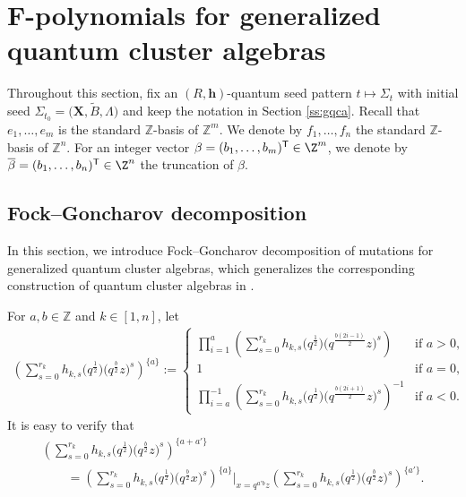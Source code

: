 \section[F-polynomials for generalized quantum cluster algebras]{$\boldsymbol{F}$-polynomials for generalized quantum cluster algebras}

Throughout this section, fix an $(R,\mathbf{h})$-quantum seed pattern $t\mapsto \Sigma_t$ with initial seed $\Sigma_{t_0}=\bigl(\mathbf{X},\tilde{B},\Lambda\bigr)$ and keep the notation in Section \ref{ss:gqca}. Recall that $e_1,\dots, e_m$ is the standard $\mathbb{Z}$-basis of $\mathbb{Z}^m$. We denote by $f_1,\dots, f_n$ the standard $\mathbb{Z}$-basis of $\mathbb{Z}^n$.
For an integer vector $\beta=(b_1,\dots, b_m)^{\mathsf T}\in \Z^m$, we denote by $\overline{\beta}=(b_1,\dots, b_n)^{\mathsf T}\in \Z^n$ the truncation of $\beta$.
\subsection{Fock--Goncharov decomposition}\label{s:FG-decom-GQCA}
In this section, we introduce Fock--Goncharov decomposition of mutations for generalized quantum cluster algebras, which generalizes the corresponding construction of quantum cluster algebras in \cite{fock2009,Keller2012}.


For $a,b\in\mathbb{Z}$ and $k\in[1,n]$, let
\begin{align*}
 \left(\sum\limits^{r_{k}}_{s=0}h_{k,s}\bigl(q^{\frac{1}{2}}\bigr)\bigl(q^{\frac{b}{2}}z\bigr)^{s}\right)^{\{a\}}:=
 \begin{cases}\displaystyle\prod\limits_{i=1}^{a}
 \left(\sum\limits^{r_{k}}_{s=0}h_{k,s}\bigl(q^{\frac{1}{2}}\bigr)\bigl(q^{\frac{b(2i-1)}{2}}z\bigr)^{s}\right)&\text{if } a>0,\\
 1&\text{if }a=0,\\
 \displaystyle \prod\limits_{i=a}^{-1}\left(\sum\limits^{r_{k}}_{s=0}h_{k,s}\bigl(q^{\frac{1}{2}}\bigr)\bigl(q^{\frac{b(2i+1)}{2}}z\bigr)^{s}\right)^{-1}&\text{if } a<0.
 \end{cases}
\end{align*}
It is easy to verify that
\begin{gather}
 \left(\sum\limits^{r_{k}}_{s=0}h_{k,s}\bigl(q^{\frac{1}{2}}\bigr)\bigl(q^{\frac{b}{2}}z\bigr)^{s}\right)^{\{a+a'\}}\nonumber\\
 \qquad=\left(\sum\limits^{r_{k}}_{s=0}h_{k,s}\bigl(q^{\frac{1}{2}}\bigr)\bigl(q^{\frac{b}{2}}x\bigr)^{s}\right)^{\{a\}}\bigg|_{x=q^{a'b}z}
 \left(\sum\limits^{r_{k}}_{s=0}h_{k,s}\bigl(q^{\frac{1}{2}}\bigr)\bigl(q^{\frac{b}{2}}z\bigr)^{s}\right)^{\{a'\}}.\label{eq:FG-decom}
\end{gather}

